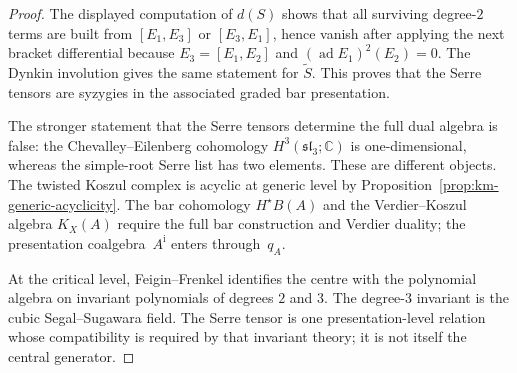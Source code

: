 \begin{proof}
The displayed computation of $d(S)$ shows that all surviving
degree-$2$ terms are built from $[E_1,E_3]$ or $[E_3,E_1]$, hence
vanish after applying the next bracket differential because
$E_3=[E_1,E_2]$ and $(\operatorname{ad}E_1)^2(E_2)=0$.
The Dynkin involution gives the same statement for $\tilde S$.
This proves that the Serre tensors are syzygies in the
associated graded bar presentation.

The stronger statement that the Serre tensors determine the full
dual algebra is false: the Chevalley--Eilenberg cohomology
$H^3(\mathfrak{sl}_3;\mathbb C)$ is one-dimensional, whereas the
simple-root Serre list has two elements. These are different objects.
The twisted Koszul complex is acyclic at generic level by
Proposition~\ref{prop:km-generic-acyclicity}. The bar cohomology
$H^\star B(A)$ and the Verdier--Koszul algebra $K_X(A)$ require the
full bar construction and Verdier duality; the presentation
coalgebra~$A^{\mathrm i}$ enters through~$q_A$.

At the critical level, Feigin--Frenkel identifies the centre with the
polynomial algebra on invariant polynomials of degrees $2$ and $3$.
The degree-$3$ invariant is the cubic Segal--Sugawara field. The Serre
tensor is one presentation-level relation whose compatibility is
required by that invariant theory; it is not itself the central
generator.
\end{proof}

